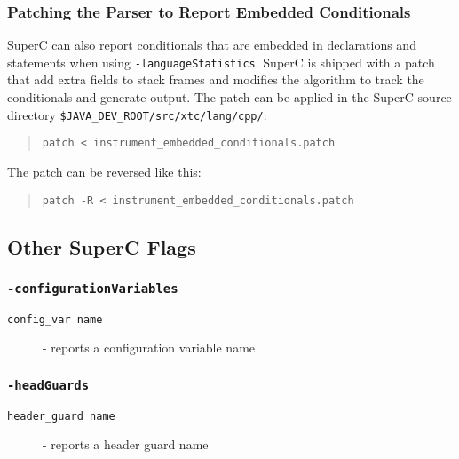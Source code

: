 \documentclass{article}
\newcommand{\SuperC}{{\textsf{Su\-perC}}}
\begin{document}
\subsubsection{Patching the Parser to Report Embedded Conditionals}
\label{section:patching}

\SuperC{} can also report conditionals that are embedded in
declarations and statements when using \texttt{-languageStatistics}.
\SuperC{} is shipped with a patch that add extra fields to stack
frames and modifies the algorithm to track the conditionals and
generate output.  The patch can be applied in the \SuperC{} source
directory \verb"$JAVA_DEV_ROOT/src/xtc/lang/cpp/":

\begin{quote}
\begin{verbatim}
patch < instrument_embedded_conditionals.patch 
\end{verbatim}
\end{quote}

The patch can be reversed like this:

\begin{quote}
\begin{verbatim}
patch -R < instrument_embedded_conditionals.patch 
\end{verbatim}
\end{quote}


\subsection{Other \SuperC{} Flags}

\subsubsection{\texttt{-configurationVariables}}
\begin{description}
\item[\texttt{config\_var name}] - reports a configuration variable name
\end{description}

\subsubsection{\texttt{-headGuards}}
\begin{description}
\item[\texttt{header\_guard name}] - reports a header guard name
\end{description}
\end{document}
